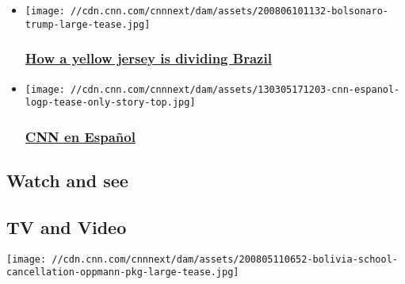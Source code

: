 \begin{itemize}
\item
  \href{/2020/08/06/football/bolsonaro-brazil-foootball-yellow-shirt-cmd-spt-intl/index.html}{}

  \texttt{[image: //cdn.cnn.com/cnnnext/dam/assets/200806101132-bolsonaro-trump-large-tease.jpg]}

  \hypertarget{how-a-yellow-jersey-is-dividing-brazil}{%
  \subsubsection{\texorpdfstring{\href{/2020/08/06/football/bolsonaro-brazil-foootball-yellow-shirt-cmd-spt-intl/index.html}{How
  a yellow jersey is dividing
  Brazil}}{How a yellow jersey is dividing Brazil}}\label{how-a-yellow-jersey-is-dividing-brazil}}
\end{itemize}

\begin{itemize}
\item
  \href{http://cnnespanol.cnn.com/?hpt=header_edition-picker}{}

  \texttt{[image: //cdn.cnn.com/cnnnext/dam/assets/130305171203-cnn-espanol-logp-tease-only-story-top.jpg]}

  \hypertarget{cnn-en-espauxf1ol}{%
  \subsubsection{\texorpdfstring{\href{http://cnnespanol.cnn.com/?hpt=header_edition-picker}{CNN
  en Español}}{CNN en Español}}\label{cnn-en-espauxf1ol}}
\end{itemize}

\hypertarget{watch-and-see-}{%
\subsection{Watch and see~}\label{watch-and-see-}}

\hypertarget{tv-and-video}{%
\subsection{TV and Video}\label{tv-and-video}}

\href{/videos/world/2020/08/05/bolivia-schools-closed-coronavirus-covid-19-pandemic-cases-latin-america-oppmann-pkg-intl-ldn-vpx.cnn}{}

\texttt{[image: //cdn.cnn.com/cnnnext/dam/assets/200805110652-bolivia-school-cancellation-oppmann-pkg-large-tease.jpg]}

